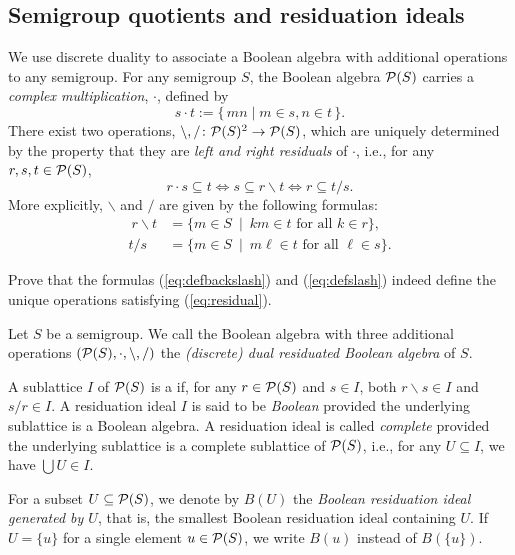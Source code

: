 \subsection*{Semigroup quotients and residuation ideals}

We use discrete duality to associate a Boolean algebra with additional operations to any semigroup. For any semigroup $S$, the Boolean algebra $\mathcal{P}(S)$ carries a \emph{complex multiplication}, $\cdot$, defined by 
\[ s \cdot t := \{\,mn \mid  m \in s, n \in t\,\}.\]
There exist two operations, $\backslash, \slash \colon \mathcal{P}(S)^2 \to \mathcal{P}(S)$, which are uniquely determined by the property that they are \emph{left and right residuals} of $\cdot$, i.e., for any $r, s, t \in \mathcal{P}(S)$, 
\begin{equation}\label{eq:residual} r\cdot s \subseteq t \iff s \subseteq r \backslash t \iff r \subseteq t \slash s.
  \end{equation}
More explicitly, $\backslash$ and $\slash$ are given by the following formulas:
\begin{align}\
 r \backslash t &=\{m \in S \ \mid \ km \in t \text{ for all } k \in r\}, \label{eq:defbackslash}\\
 t \slash s &= \{m \in S \ \mid \ m\ell \in t \text{ for all } \ell \in s\}. \label{eq:defslash}
\end{align}
\begin{exercise}\easy
Prove that the formulas (\ref{eq:defbackslash}) and (\ref{eq:defslash}) indeed define the unique operations satisfying (\ref{eq:residual}).
\end{exercise}

\begin{definition}
Let $S$ be a semigroup. We call the Boolean algebra with three additional operations  $(\mathcal{P}(S), \cdot, \backslash, \slash)$ the \emph{(discrete) dual residuated Boolean algebra} of $S$.

A sublattice $I$ of $\mathcal{P}(S)$ is a  if, for any $r \in \mathcal{P}(S)$ and $s \in I$, both $r \backslash s \in I$ and $s \slash r \in I$. A residuation ideal $I$ is said to be \emph{Boolean} provided the underlying sublattice is a Boolean algebra. A residuation ideal is called \emph{complete} provided the underlying sublattice is a complete sublattice of $\mathcal{P}(S)$, i.e., for any $U \subseteq I$, we have $\bigcup U \in I$.

For a subset $U \subseteq \mathcal{P}(S)$, we denote by $B(U)$ the \emph{Boolean residuation ideal generated by $U$}, that is, the smallest Boolean residuation ideal containing $U$. If $U = \{u\}$ for a single element $u \in \mathcal{P}(S)$, we write $B(u)$ instead of $B(\{u\})$. 
\end{definition}

